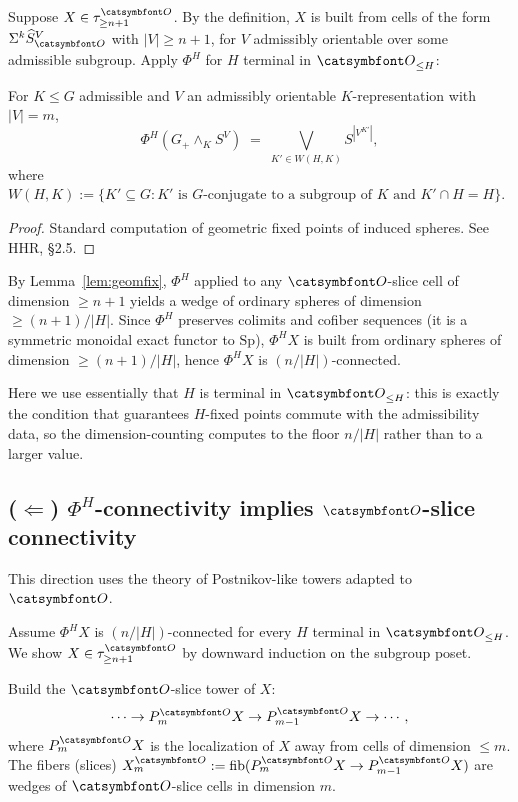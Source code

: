 Suppose $X\in\tau^\aO_{\geq n+1}$. By the definition, $X$ is built from cells of the form $\Sigma^k \widehat S^V_\aO$ with $|V|\geq n+1$, for $V$ admissibly orientable over some admissible subgroup. Apply $\Phi^H$ for $H$ terminal in $\aO_{\leq H}$:

\begin{lemma}\label{lem:geomfix}
For $K\leq G$ admissible and $V$ an admissibly orientable $K$-representation with $|V|=m$,
\[
   \Phi^H(G_+\wedge_K S^V) \;=\; \bigvee_{K'\in W(H,K)} S^{|V^{K'}|},
\]
where $W(H,K) := \{K'\subseteq G : K' \text{ is $G$-conjugate to a subgroup of $K$ and } K'\cap H = H\}$.
\end{lemma}

\begin{proof}
Standard computation of geometric fixed points of induced spheres. See HHR, \S2.5.
\end{proof}

By Lemma~\ref{lem:geomfix}, $\Phi^H$ applied to any $\aO$-slice cell of dimension $\geq n+1$ yields a wedge of ordinary spheres of dimension $\geq (n+1)/|H|$. Since $\Phi^H$ preserves colimits and cofiber sequences (it is a symmetric monoidal exact functor to $\mathrm{Sp}$), $\Phi^H X$ is built from ordinary spheres of dimension $\geq (n+1)/|H|$, hence $\Phi^H X$ is $(n/|H|)$-connected.

Here we use essentially that $H$ is terminal in $\aO_{\leq H}$: this is exactly the condition that guarantees $H$-fixed points commute with the admissibility data, so the dimension-counting computes to the floor $n/|H|$ rather than to a larger value.

\subsection{($\Leftarrow$) $\Phi^H$-connectivity implies $\aO$-slice connectivity}

This direction uses the theory of Postnikov-like towers adapted to $\aO$.

Assume $\Phi^H X$ is $(n/|H|)$-connected for every $H$ terminal in $\aO_{\leq H}$. We show $X\in \tau^\aO_{\geq n+1}$ by downward induction on the subgroup poset.

Build the $\aO$-slice tower of $X$:
\[
   \cdots \to P^\aO_m X \to P^\aO_{m-1} X \to \cdots,
\]
where $P^\aO_m X$ is the localization of $X$ away from cells of dimension $\leq m$. The fibers (slices) $X^\aO_m := \mathrm{fib}(P^\aO_m X\to P^\aO_{m-1}X)$ are wedges of $\aO$-slice cells in dimension $m$.

